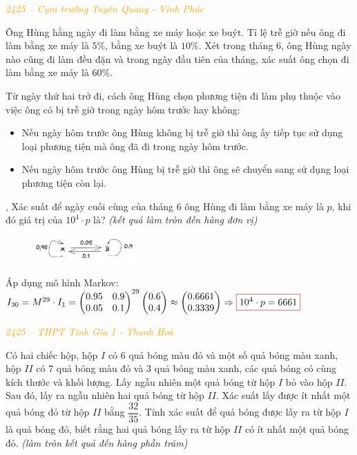 \documentclass[twoside,final]{hcmut-report}
\newcommand{\exercise}[1]{\begin{exercisebox}#1\end{exercisebox}}
\newcommand{\result}[1]{\fcolorbox{red}{white}{#1}}
\begin{document}
\exercise{
    \textcolor{orange}{\textit{2425 -- Cụm trường Tuyên Quang - Vĩnh Phúc}}

    Ông Hùng hằng ngày đi làm bằng xe máy hoặc xe buýt. Tỉ lệ trễ giờ nếu ông đi làm bằng xe máy là $5\%$, bằng xe buýt là $10\%$. Xét trong tháng 6, ông Hùng ngày nào cũng đi làm đều đặn và trong ngày đầu tiên của tháng, xác suất ông chọn đi làm bằng xe máy là $60\%$.

    Từ ngày thứ hai trở đi, cách ông Hùng chọn phương tiện đi làm phụ thuộc vào việc ông có bị trễ giờ trong ngày hôm trước hay không:
    \begin{itemize}[itemsep=0pt, topsep=0pt, parsep=0pt,label=-]
        \item Nếu ngày hôm trước ông Hùng không bị trễ giờ thì ông ấy tiếp tục sử dụng loại phương tiện mà ông đã đi trong ngày hôm trước.
        \item Nếu ngày hôm trước ông Hùng bị trễ giờ thì ông sẽ chuyển sang sử dụng loại phương tiện còn lại.
    \end{itemize}
    ,
    Xác suất để ngày cuối cùng của tháng 6 ông Hùng đi làm bằng xe máy là $p$, khi đó giá trị của $10^4\cdot p$ là? \textit{(kết quả làm tròn đến hàng đơn vị)}
}
\begin{figure}[H]
    \centering
    \includegraphics*[width=0.35\textwidth]{images/XSTK/TQ-VP.png}
\end{figure}
Áp dụng mô hình Markov: $I_{30} = M^{29}\cdot I_1 = \begin{pmatrix}
        0.95 & 0.9 \\
        0.05 & 0.1
    \end{pmatrix}^{29} \begin{pmatrix}
        0.6 \\ 0.4
    \end{pmatrix} \approx \begin{pmatrix}
        0.6661 \\0.3339
    \end{pmatrix} \Rightarrow \result{$10^4\cdot p = 6661$}$

\exercise{
    \textcolor{orange}{\textit{2425 -- THPT Tĩnh Gia 1 - Thanh Hoá}}

    Có hai chiếc hộp, hộp $I$ có $6$ quả bóng màu đỏ và một số quả bóng màu xanh, hộp $II$ có $7$ quả bóng màu đỏ và $3$ quả bóng màu xanh, các quả bóng có cùng kích thước và khối lượng. Lấy ngẫu nhiên một quả bóng từ hộp $I$ bỏ vào hộp $II$. Sau đó, lấy ra ngẫu nhiên hai quả bóng từ hộp $II$. Xác suất lấy được ít nhất một quả bóng đỏ từ hộp $II$ bằng $\dfrac{32}{35}$. Tính xác suất để quả bóng được lấy ra từ hộp $I$ là quả bóng đỏ, biết rằng hai quả bóng lấy ra từ hộp $II$ có ít nhất một quả bóng đỏ. \textit{(làm tròn kết quả đến hàng phần trăm)}}
\end{document}
